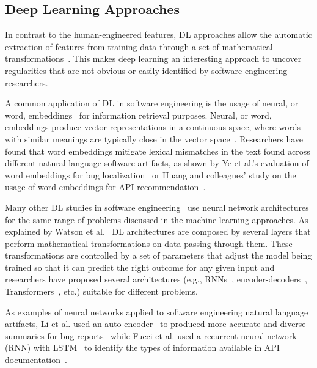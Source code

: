 \subsection{Deep Learning Approaches}
\label{cp2:deep-learning}



In contrast to the human-engineered features,
\acf{DL} approaches allow the automatic extraction of features 
from training data through a set of mathematical transformations~\cite{Deng2018, zhang2021deep}.
This makes 
deep learning an interesting 
approach to
uncover regularities 
that are not obvious or easily identified
by software engineering researchers.



A common application of \acs{DL} in software engineering is the usage of neural, or word, embeddings~\cite{Mikolov2013}
for information retrieval purposes. 
Neural, or word, embeddings produce vector representations in a continuous space,
where words with similar meanings are typically close in the vector space~\cite{harris1954distributional, mikolov2013efficient}. 
Researchers have found that word
embeddings mitigate lexical mismatches in the text found across different 
natural language software artifacts,
as shown by Ye et al.'s evaluation of word embeddings
for bug localization~\cite{Ye2016}
or Huang and colleagues' study on 
the usage of word embeddings for API recommendation~\cite{Huang2018}.



Many other \acs{DL} studies in software engineering~\cite{ferreira2021,li2018deep}
use neural network architectures 
for the same range of problems discussed in the machine learning approaches.
As explained by Watson et al.~\cite{watson2022}
\acs{DL} architectures are composed by several layers 
that perform mathematical transformations on data passing through them. 
These transformations are controlled by a set of parameters that 
adjust the model being trained so that it can predict 
the right outcome for any given input
and researchers have proposed 
several architectures (e.g., \acs{RNN}s~\cite{rumelhart1986rnn, sutskever2014seq2seq}, encoder-decoders~\cite{bahdanau2014neural}, Transformers~\cite{Vaswani2017attention}, etc.) 
suitable for different problems. 



As examples of neural networks applied to software engineering natural language artifacts,
Li et al. used an auto-encoder~\cite{liou2014autoencoder}
to produced more accurate and diverse summaries 
for bug reports~\cite{li2018deep} while 
Fucci et al. used a 
recurrent neural network (\acs{RNN}) with 
\acf{LSTM}~\cite{hochreiter1997lstm}
to identify the types of information available in 
API documentation~\cite{fucci2019}.



